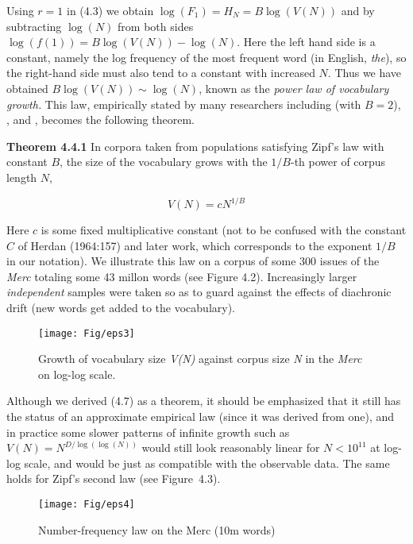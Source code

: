 Using $r=1$ in (4.3) we obtain $\log(F_1) = H_N = B\log(V(N))$ and by
subtracting $\log(N)$ from both sides $\log(f(1))=B\log(V(N))-\log(N)$. Here
the left hand side is a constant, namely the log frequency of the most
frequent word (in English, {\it the}), so the right-hand side must also tend
to a constant with increased $N$. Thus we have obtained $B\log(V(N)) \sim
\log(N)$, known as the {\it power law of vocabulary growth.}  This law,
empirically stated by many researchers including  (with
$B=2$), , and , becomes the following
theorem.

\smallskip
\noindent
{\bf Theorem 4.4.1} In corpora taken from populations satisfying Zipf's law 
with constant $B$, the size of the vocabulary grows with the $1/B$-th power of 
corpus length $N$,  

\begin{equation} %
V(N)=cN^{1/B}
\end{equation}

\noindent
Here $c$ is some fixed multiplicative constant (not to be confused with the
constant $C$ of Herdan (1964:157) and later work, which corresponds to the
exponent $1/B$ in our notation).  We illustrate this law on a corpus of some
300 issues of the {\it Merc} totaling some 43 millon words (see Figure
4.2). Increasingly larger {\it independent} samples were taken so as to guard
against the effects of diachronic drift (new words get added to the
vocabulary).

\begin{figure}[htbp]
\begin{center}
\texttt{[image: Fig/eps3]}
\caption{\protect\small Growth of vocabulary size {\it V(N)} against corpus
size {\it N} in the {\it Merc} on log-log scale.}
\end{center}
\end{figure}

\vspace*{-6mm}
\noindent
Although we derived (4.7) as a theorem, it should be emphasized that it still
has the status of an approximate empirical law (since it was derived from
one), and in practice some slower patterns of infinite growth such as
$V(N)=N^{D/\log(\log(N))}$ would still look reasonably linear for $N <10^{11}$
at log-log scale, and would be just as compatible with the observable data.
The same holds for Zipf's second law (see Figure~4.3).

\begin{figure}[h]
\begin{center}
\texttt{[image: Fig/eps4]}
\caption{\protect\small Number-frequency law on the Merc (10m words)}
\end{center}
\end{figure}

